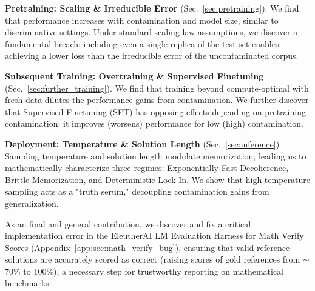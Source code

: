 \textbf{Pretraining: Scaling \& Irreducible Error} (Sec.~\ref{sec:pretraining}). We find that performance increases with contamination and model size, similar to discriminative settings. Under standard scaling law assumptions, we discover a fundamental breach: including even a single replica of the test set enables achieving a lower loss than the irreducible error of the uncontaminated corpus.

\textbf{Subsequent Training: Overtraining \& Supervised Finetuning} (Sec.~\ref{sec:further_training}). We find that training beyond compute-optimal with fresh data dilutes the performance gains from contamination. We further discover that Supervised Finetuning (SFT) has opposing effects depending on pretraining contamination: it improves (worsens) performance for low (high) contamination.

\textbf{Deployment: Temperature \& Solution Length} (Sec.~\ref{sec:inference}) Sampling temperature and solution length modulate memorization, leading us to mathematically characterize three regimes: Exponentially Fast Decoherence, Brittle Memorization, and Deterministic Lock-In. We show that high-temperature sampling acts as a "truth serum," decoupling contamination gains from generalization.

As an final and general contribution, we discover and fix a critical implementation error in the EleutherAI LM Evaluation Harness \citep{gao2024evalharness} for Math Verify Scores (Appendix~\ref{app:sec:math_verify_bug}), ensuring that valid reference solutions are accurately scored as correct (raising scores of gold references from $\mathord{\sim}$70\% to 100\%), a necessary step for trustworthy reporting on mathematical benchmarks.
